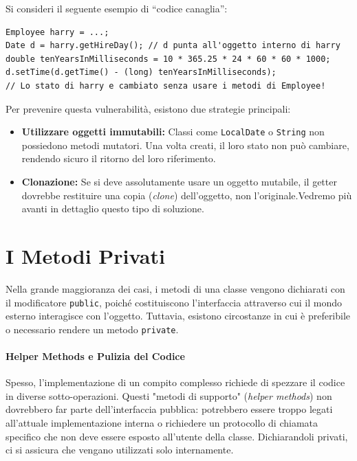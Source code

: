 Si consideri il seguente esempio di ``codice canaglia'':
\begin{lstlisting}[caption={Violazione dell'incapsulamento}]
Employee harry = ...;
Date d = harry.getHireDay(); // d punta all'oggetto interno di harry
double tenYearsInMilliseconds = 10 * 365.25 * 24 * 60 * 60 * 1000;
d.setTime(d.getTime() - (long) tenYearsInMilliseconds); 
// Lo stato di harry e cambiato senza usare i metodi di Employee!
\end{lstlisting}

\begin{warningbox}
    Per prevenire questa vulnerabilità, esistono due strategie principali:
    \begin{itemize}
        \item \textbf{Utilizzare oggetti immutabili:} Classi come \texttt{LocalDate} o \texttt{String} non possiedono metodi mutatori. Una volta creati, il loro stato non può cambiare, rendendo sicuro il ritorno del loro riferimento.
        \item \textbf{Clonazione:} Se si deve assolutamente usare un oggetto mutabile, il getter dovrebbe restituire una copia (\textit{clone}) dell'oggetto, non l'originale.Vedremo più avanti in dettaglio questo tipo di soluzione. 
    \end{itemize}
\end{warningbox}

\section{I Metodi Privati}

Nella grande maggioranza dei casi, i metodi di una classe vengono dichiarati con il modificatore \texttt{public}, poiché costituiscono l'interfaccia attraverso cui il mondo esterno interagisce con l'oggetto. Tuttavia, esistono circostanze in cui è preferibile o necessario rendere un metodo \texttt{private}.

\paragraph{Helper Methods e Pulizia del Codice}
Spesso, l'implementazione di un compito complesso richiede di spezzare il codice in diverse sotto-operazioni. Questi "metodi di supporto" (\textit{helper methods}) non dovrebbero far parte dell'interfaccia pubblica: potrebbero essere troppo legati all'attuale implementazione interna o richiedere un protocollo di chiamata specifico che non deve essere esposto all'utente della classe. Dichiarandoli privati, ci si assicura che vengano utilizzati solo internamente.

